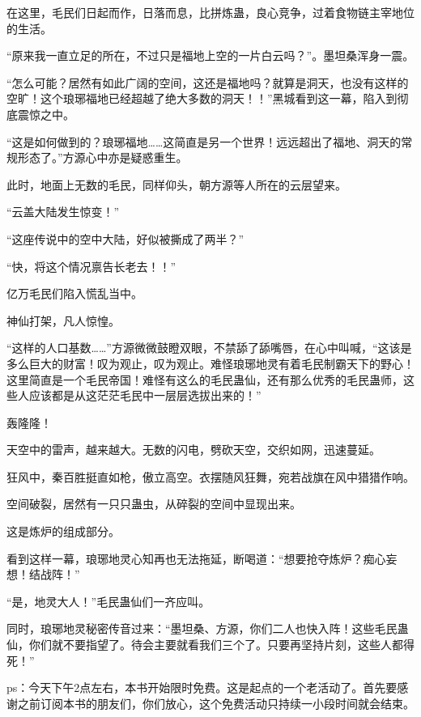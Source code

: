 \begin{this_body}
在这里，毛民们日起而作，日落而息，比拼炼蛊，良心竞争，过着食物链主宰地位的生活。

“原来我一直立足的所在，不过只是福地上空的一片白云吗？”。墨坦桑浑身一震。

“怎么可能？居然有如此广阔的空间，这还是福地吗？就算是洞天，也没有这样的空旷！这个琅琊福地已经超越了绝大多数的洞天！！”黑城看到这一幕，陷入到彻底震惊之中。

“这是如何做到的？琅琊福地……这简直是另一个世界！远远超出了福地、洞天的常规形态了。”方源心中亦是疑惑重生。

此时，地面上无数的毛民，同样仰头，朝方源等人所在的云层望来。

“云盖大陆发生惊变！”

“这座传说中的空中大陆，好似被撕成了两半？”

“快，将这个情况禀告长老去！！”

亿万毛民们陷入慌乱当中。

神仙打架，凡人惊惶。

“这样的人口基数……”方源微微鼓瞪双眼，不禁舔了舔嘴唇，在心中叫喊，“这该是多么巨大的财富！叹为观止，叹为观止。难怪琅琊地灵有着毛民制霸天下的野心！这里简直是一个毛民帝国！难怪有这么的毛民蛊仙，还有那么优秀的毛民蛊师，这些人应该都是从这茫茫毛民中一层层选拔出来的！”

轰隆隆！

天空中的雷声，越来越大。无数的闪电，劈砍天空，交织如网，迅速蔓延。

狂风中，秦百胜挺直如枪，傲立高空。衣摆随风狂舞，宛若战旗在风中猎猎作响。

空间破裂，居然有一只只蛊虫，从碎裂的空间中显现出来。

这是炼炉的组成部分。

看到这样一幕，琅琊地灵心知再也无法拖延，断喝道：“想要抢夺炼炉？痴心妄想！结战阵！”

“是，地灵大人！”毛民蛊仙们一齐应叫。

同时，琅琊地灵秘密传音过来：“墨坦桑、方源，你们二人也快入阵！这些毛民蛊仙，你们就不要指望了。待会主要就看我们三个了。只要再坚持片刻，这些人都得死！”

ps：今天下午2点左右，本书开始限时免费。这是起点的一个老活动了。首先要感谢之前订阅本书的朋友们，你们放心，这个免费活动只持续一小段时间就会结束。

\end{this_body}

